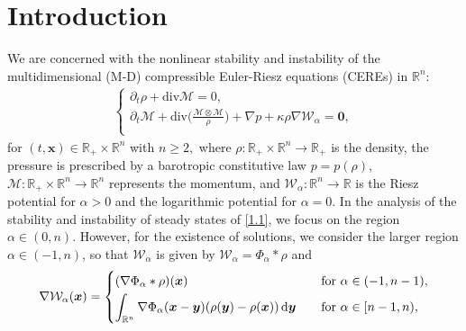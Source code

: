 \documentclass[reqno,11pt]{amsart}
\numberwithin{equation}{section}
\newcommand{\R}{\mathbb{R}}
\theoremstyle{definition}
\def\r{\rho}
\def\dd{{\, \rm d}}
\begin{document}
\date{\today}

\maketitle

\thispagestyle{empty}

\section{Introduction}
We are concerned with the nonlinear stability and instability of 
the multidimensional (M-D) compressible Euler-Riesz equations (CEREs) in $\R^n:$
\begin{align}\label{1.1}
\begin{cases}
\displaystyle
\partial_t \rho+\mbox{div} \mathcal{M}=0,\\
\displaystyle
\partial_t \mathcal{M}+\mbox{div}\Big(\frac{\mathcal{M}\otimes \mathcal{M}}{\rho}\Big)+\nabla p+\kappa\rho\nabla\mathcal{W}_\alpha=\boldsymbol{0},\\
\end{cases}
\end{align}
for $(t, \boldsymbol{x})\in\R_+\times\mathbb{\R}^n$ with $n \geq 2,$
where $\r:\R_+\times\mathbb{\R}^n \to \mathbb{R}_+$ is the density, the pressure is prescribed by a barotropic constitutive law $p=p(\rho)$, $\mathcal{M}: \R_+\times\mathbb{\R}^n \to \mathbb{\R}^n$ represents the momentum,
and $\mathcal{W}_\alpha : \mathbb{R}^n \to \mathbb{R}$ is the Riesz potential for $\alpha > 0$ 
and the logarithmic potential for $\alpha = 0$.
In the analysis of the stability and instability of steady states of \eqref{1.1},
 we focus on the region $\alpha \in (0,n)$. 
 However, for the existence of solutions, we consider the larger region $\alpha \in (-1,n)$, so that
 $\mathcal{W}_\alpha$ is given by $\mathcal{W}_\alpha=\Phi_\alpha *\rho$ and 
 \[
 \nabla \mathcal{W}_\alpha(\boldsymbol{x}) =
 \begin{cases}
    \displaystyle
     (\nabla \Phi_\alpha * \rho) (\boldsymbol{x}) & \text{for } \alpha \in (-1,n-1), \\[1mm]
     \displaystyle
     \int_{\mathbb{R}^n} \nabla \Phi_\alpha(\boldsymbol{x} - \boldsymbol{y}) (\rho(\boldsymbol{y}) - \rho(\boldsymbol{x})) \dd \boldsymbol{y} \quad & \text{for } \alpha \in [n-1,n),
 \end{cases}
 \]
\end{document}
